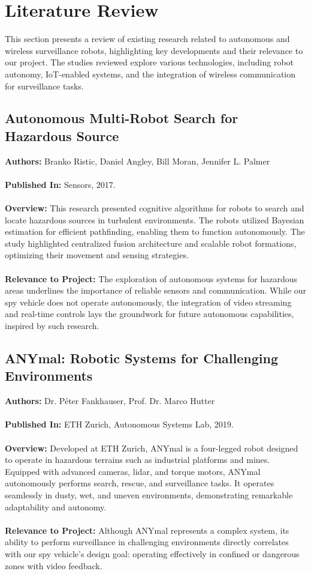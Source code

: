 \documentclass[12pt,a4paper]{report}
\begin{document}
\section{Literature Review}

This section presents a review of existing research related to autonomous and wireless surveillance robots, highlighting key developments and their relevance to our project. The studies reviewed explore various technologies, including robot autonomy, IoT-enabled systems, and the integration of wireless communication for surveillance tasks.

\subsection{Autonomous Multi-Robot Search for Hazardous Source}
\textbf{Authors:} Branko Ristic, Daniel Angley, Bill Moran, Jennifer L. Palmer \\ \\
\textbf{Published In:} Sensors, 2017. \\ \\
\textbf{Overview:} This research presented cognitive algorithms for robots to search and locate hazardous sources in turbulent environments. The robots utilized Bayesian estimation for efficient pathfinding, enabling them to function autonomously. The study highlighted centralized fusion architecture and scalable robot formations, optimizing their movement and sensing strategies. \\ \\
\textbf{Relevance to Project:} The exploration of autonomous systems for hazardous areas underlines the importance of reliable sensors and communication. While our spy vehicle does not operate autonomously, the integration of video streaming and real-time controls lays the groundwork for future autonomous capabilities, inspired by such research.

\subsection{ANYmal: Robotic Systems for Challenging Environments}
\textbf{Authors:} Dr. Péter Fankhauser, Prof. Dr. Marco Hutter \\ \\
\textbf{Published In:} ETH Zurich, Autonomous Systems Lab, 2019. \\ \\
\textbf{Overview:} Developed at ETH Zurich, ANYmal is a four-legged robot designed to operate in hazardous terrains such as industrial platforms and mines. Equipped with advanced cameras, lidar, and torque motors, ANYmal autonomously performs search, rescue, and surveillance tasks. It operates seamlessly in dusty, wet, and uneven environments, demonstrating remarkable adaptability and autonomy. \\ \\
\textbf{Relevance to Project:} Although ANYmal represents a complex system, its ability to perform surveillance in challenging environments directly correlates with our spy vehicle's design goal: operating effectively in confined or dangerous zones with video feedback.
\end{document}
